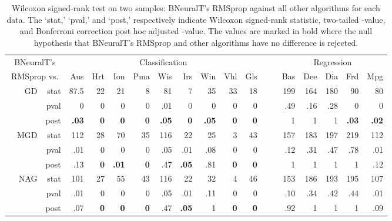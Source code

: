\documentclass[11pt,a4paper]{article}
\begin{document}
    \begin{table} \small
        \centering
        \renewcommand{\arraystretch}{1.05}
        \setlength{\tabcolsep}{3pt}
        \caption{Wilcoxon signed-rank test on two samples: BNeuralT's RMSprop against all other algorithms for each data. The `stat,' `pval,' and `post,' respectively indicate Wilcoxon signed-rank statistic, two-tailed -value, and Bonferroni correction post hoc adjusted -value. The values are marked in bold where the null hypothesis that BNeuralT's RMSprop and other algorithms have no difference is rejected.}
        \label{tab:BNeuralT_RMSprop_VS_All_W_Rank_Test}\begin{tabular}[t]{lrrrrrrrrrrrrrrrrr}
            \toprule
            \multicolumn{3}{c}{BNeuralT's} & \multicolumn{9}{c}{Classification} & ~~ & \multicolumn{5}{c}{Regression} \\
            \cline{4-12}\cline{14-18}
            \multicolumn{3}{c}{RMSprop vs.}  & Aus & Hrt & Ion & Pma & Wis & Irs & Win & Vhl & Gls & ~ & Bas & Dee & Dia & Frd & Mpg \\
            \midrule
            \parbox[t]{3mm}{}
            & GD & stat & 87.5 & 22 & 21 & 8 & 81 & 7 & 35 & 33 & 18 &  & 199 & 164 & 180 & 90 & 80 \\
            &  & pval & 0 & 0 & 0 & 0 & .01 & 0 & 0 & 0 & 0 &  & .49 & .16 & .28 & 0 & 0 \\
            &  & post & \textbf{.03} & \textbf{0} & \textbf{0} & \textbf{0} & \textbf{.05} & \textbf{0} & \textbf{.05} & \textbf{0} & \textbf{0} &  & 1 & 1 & 1 & \textbf{.03} & \textbf{.02} \\
& MGD & stat & 112 & 28 & 70 & 35 & 116 & 22 & 25 & 3 & 43 &  & 157 & 183 & 197 & 219 & 112 \\
            &  & pval & .01 & 0 & 0 & 0 & .05 & .01 & .08 & 0 & 0 &  & .12 & .31 & .47 & .78 & .01 \\
            &  & post & .13 & \textbf{0} & \textbf{.01} & \textbf{0} & .47 & \textbf{.05} & .81 & \textbf{0} & \textbf{0 }&  & 1 & 1 & 1 & 1 & .12 \\
& NAG & stat & 101 & 27 & 55 & 43 & 116 & 22 & 32 & 4 & 46 &  & 153 & 186 & 193 & 195 & 107 \\
            &  & pval & .01 & 0 & 0 & 0 & .05 & .01 & .11 & 0 & 0 &  & .10 & .34 & .42 & .44 & .01 \\
            &  & post & .07 & \textbf{0} & \textbf{0} & \textbf{0} & .47 & \textbf{.05} & 1 & \textbf{0} & \textbf{0} &  & .92 & 1 & 1 & 1 & .09 \\

\end{tabular}
\end{table}
\end{document}
